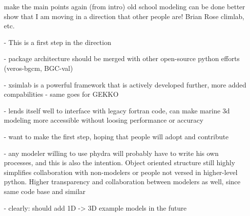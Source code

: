 \documentclass[template.tex]{subfiles}
\begin{document}
\conclusions  %
make the main points again (from intro)
old school modeling can be done better
show that I am moving in a direction that other people are! Brian Rose climlab, etc.

- This is a first step in the direction

- package architecture should be merged with other open-source python efforts (veros-bgcm, BGC-val)

- xsimlab is a powerful framework that is actively developed further, more added compabilities
- same goes for GEKKO

- lends itself well to interface with legacy fortran code, can make marine 3d modeling more accessible without loosing performance or accuracy

- want to make the first step, hoping that people will adopt and contribute

- any modeler willing to use phydra will probably have to write his own processes, and this is also the intention. Object oriented structure still highly simplifies collaboration with non-modelers or people not versed in higher-level python. Higher transparency and collaboration between modelers as well, since same code base and similar 

- clearly: should add 1D -> 3D example models in the future
\end{document}
